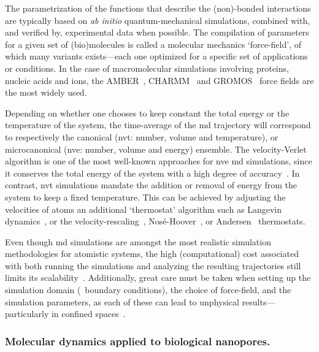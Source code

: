 The parametrization of the functions that describe the (non)-bonded interactions are typically based on
\textit{ab initio} quantum-mechanical simulations, combined with, and verified by, experimental data when
possible. The compilation of parameters for a given set of (bio)molecules is called a molecular mechanics
`force-field', of which many variants exists---each one optimized for a specific set of applications or
conditions. In the case of macromolecular simulations involving proteins, nucleic acids and ions, the
{AMBER}~\cite{Ponder-2003}, {CHARMM}~\cite{Huang-2016} and {GROMOS}~\cite{Oostenbrink-2004} force fields are
the most widely used.

Depending on whether one chooses to keep constant the total energy or the temperature of the system, the
time-average of the \gls{md} trajectory will correspond to respectively the canonical (\gls{nvt}: number,
volume and temperature), or microcanonical (\gls{nve}: number, volume and energy) ensemble. The
velocity-Verlet algorithm is one of the most well-known approaches for \gls{nve} \gls{md} simulations, since
it conserves the total energy of the system with a high degree of accuracy~\cite{Swope-1982}. In contrast,
\gls{nvt} simulations mandate the addition or removal of energy from the system to keep a fixed temperature.
This can be achieved by adjusting the velocities of atoms an additional `thermostat' algorithm such as
Langevin dynamics~\cite{Bussi-2008}, or the velocity-rescaling~\cite{Heyes-1983},
Nos\'{e}-Hoover~\cite{Nose-1984,Hoover-1985}, or Andersen~\cite{Andersen-1980} thermostats.

Even though \gls{md} simulations are amongst the most realistic simulation methodologies for atomistic
systems, the high (computational) cost associated with both running the simulations and analyzing the
resulting trajectories still limits its scalability~\cite{Vendruscolo-2011,Phillips-2020}. Additionally, great
care must be taken when setting up the simulation domain (\ie~boundary conditions), the choice of force-field,
and the simulation parameters, as each of these can lead to unphysical results---particularly in confined
spaces~\cite{Wong-ekkabut-2016a}.


\subsubsection{Molecular dynamics applied to biological nanopores.}
%

